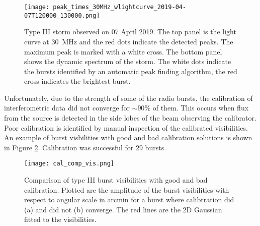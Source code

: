 \begin{figure}[ht]
\centering
\texttt{[image: peak\_times\_30MHz\_wlightcurve\_2019-04-07T120000\_130000.png]}
\caption[Type III storm observed on 07 April 2019.]{Type III storm observed on 07 April 2019. The top panel is the light curve at 30~MHz and the red dots indicate the detected peaks. The maximum peak is marked with a white cross. The bottom panel shows the dynamic spectrum of the storm. The white dots indicate the bursts identified by an automatic peak finding algorithm, the red cross indicates the brightest burst.}
\label{fig:dynamic_spectrum_070419}
\end{figure}

Unfortunately, due to the strength of some of the radio bursts, the calibration of interferometric data did not converge for $\sim 90 \%$ of them. This occurs when flux from the source is detected in the side lobes of the beam observing the calibrator. Poor calibration is identified by manual inspection of the calibrated visibilities. An example of burst visbilities with good and bad calibration solutions is shown in Figure \ref{fig:cal_comp}. Calibration was successful for 29 bursts.  

\begin{figure}[ht]
\centering
\texttt{[image: cal\_comp\_vis.png]}
\caption[Comparison of type III burst visibilities with good and bad calibration.]{Comparison of type III burst visibilities with good and bad calibration. Plotted are the amplitude of the burst visibilities with respect to angular scale in arcmin for a burst where calibtration did (a) and did not (b) converge. The red lines are the 2D Gaussian fitted to the visibilities.}
\label{fig:cal_comp}
\end{figure}

